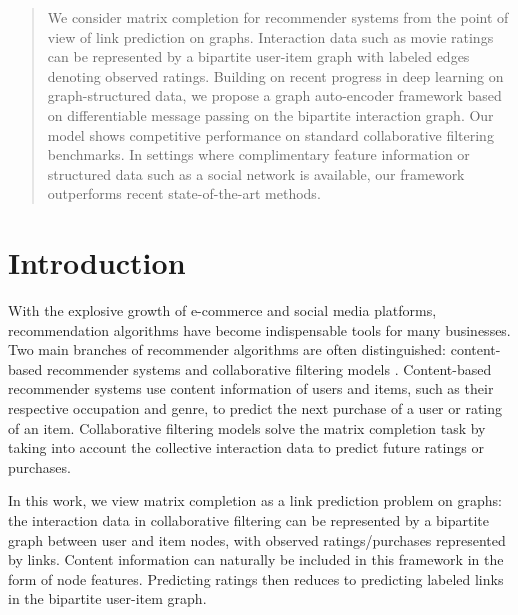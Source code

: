 \documentclass[twoside]{article}
\begin{document}




\begin{abstract}
We consider matrix completion for recommender systems from the point of view of link prediction on graphs. Interaction data such as movie ratings can be represented by a bipartite user-item graph with labeled edges denoting observed ratings. Building on recent progress in deep learning on graph-structured data, we propose a graph auto-encoder framework based on differentiable message passing on the bipartite interaction graph. Our model shows competitive performance on standard collaborative filtering benchmarks. In settings where complimentary feature information or structured data such as a social network is available, our framework outperforms recent state-of-the-art methods. 
\end{abstract}

\section{Introduction}
With the explosive growth of e-commerce and social media platforms, recommendation algorithms have become indispensable tools for many businesses. 
Two main branches of recommender algorithms are often distinguished: content-based recommender systems \cite{pazzani2007content} and collaborative filtering models \cite{goldberg1992using}. Content-based recommender systems use content information of users and items, such as their respective occupation and genre, to predict the next purchase of a user or rating of an item. Collaborative filtering models solve the matrix completion task by taking into account the collective interaction data to predict future ratings or purchases. 

In this work, we view matrix completion as a link prediction problem on graphs: the interaction data in collaborative filtering can be represented by a bipartite graph between user and item nodes, with observed ratings/purchases represented by links. Content information can naturally be included in this framework in the form of node features. Predicting ratings then reduces to predicting labeled links in the bipartite user-item graph.
\end{document}

